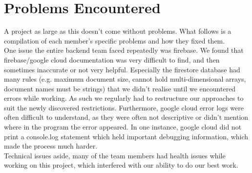 \section{Problems Encountered}
A project as large as this doesn't come without problems. What follows is a compilation of each member's specific problems and how they fixed them. \\

One issue the entire backend team faced repeatedly was firebase. We found that firebase/google cloud documentation was very difficult to find, and then sometimes inaccurate or not very helpful.
Especially the firestore database had many rules (e.g. maximum document size, cannot hold multi-dimensional arrays, document names must be strings) that we didn't realise until we encountered errors while working. 
As such we regularly had to restructure our approaches to suit the newly discovered restrictions. 
Furthermore, google cloud error logs were often difficult to understand, as they were often not descriptive or didn't mention where in the program the error appeared. In one instance, google cloud did not print a console.log statement which held important debugging information, which made the process much harder.\\
Technical issues aside, many of the team members had health issues while working on this project, which interfered with our ability to do our best work.





